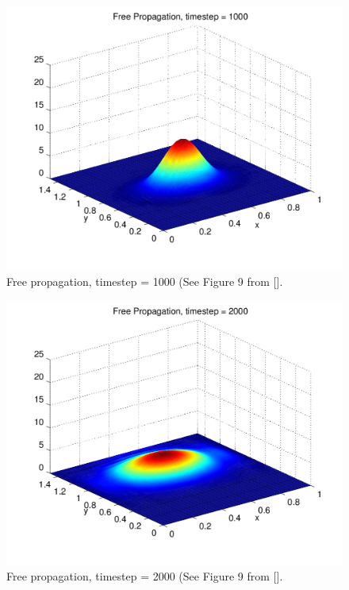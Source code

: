 \documentclass[letterpaper,12pt]{article}
\begin{document}
\begin{figure}[!htbp]
\centering
\includegraphics[scale=0.55,trim = 2mm 20mm 12mm 15mm,clip=true]{prop2.png}
\caption{Free propagation, timestep = 1000 (See Figure 9 from [].}
\label{fig:p2}
\end{figure}

\begin{figure}[!htbp]
\centering
\includegraphics[scale=0.55,trim = 2mm 20mm 12mm 15mm,clip=true]{prop3.png}
\caption{Free propagation, timestep = 2000 (See Figure 9 from [].}
\label{fig:p3}
\end{figure}
\end{document}

